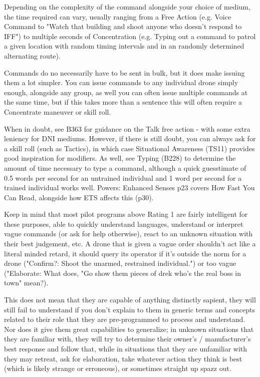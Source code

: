 \begin{multicols*}{3}
	Depending on the complexity of the command alongside your choice of medium, the time required can vary, usually ranging from a Free Action (e.g. Voice Command to "Watch that building and shoot anyone who doesn't respond to IFF") to multiple seconds of Concentration (e.g. Typing out a command to patrol a given location with random timing intervals and in an randomly determined alternating route).
	
	Commands do no necessarily have to be sent in bulk, but it does make issuing them a lot simpler. You can issue commands to any individual drone simply enough, alongside any group, as well you can often issue multiple commands at the same time, but if this takes more than a sentence this will often require a Concentrate maneuver or skill roll.
	
	When in doubt, see B363 for guidance on the Talk free action - with some extra leniency for DNI mediums. However, if there is still doubt, you can always ask for a skill roll (such as Tactics), in which case Situational Awareness (TS11) provides good inspiration for modifiers. As well, see Typing (B228) to determine the amount of time necessary to type a command, although a quick guesstimate of 0.5 words per second for an untrained individual and 1 word per second for a trained individual works well. Powers: Enhanced Senses p23 covers How Fast You Can Read, alongside how ETS affects this (p30).
	
	Keep in mind that most pilot programs above Rating 1 are fairly intelligent for these purposes, able to quickly understand languages, understand or interpret vague commands (or ask for help otherwise), react to an unknown situation with their best judgement, etc. A drone that is given a vague order shouldn't act like a literal minded retard, it should query its operator if it's outside the norm for a drone ("Confirm?: Shoot the unarmed, restrained individual.") or too vague ("Elaborate: What does, "Go show them pieces of drek who's the real boss in town" mean?). 
	
	This does not mean that they are capable of anything distinctly sapient, they will still fail to understand if you don't explain to them in generic terms and concepts related to their role that they are pre-programmed to process and understand. Nor does it give them great capabilities to generalize; in unknown situations that they are familiar with, they will try to determine their owner's / manufacturer's best response and follow that, while in situations that they are unfamiliar with they may retreat, ask for elaboration, take whatever action they think is best (which is likely strange or erroneous), or sometimes straight up spazz out.
	

\end{multicols*}
